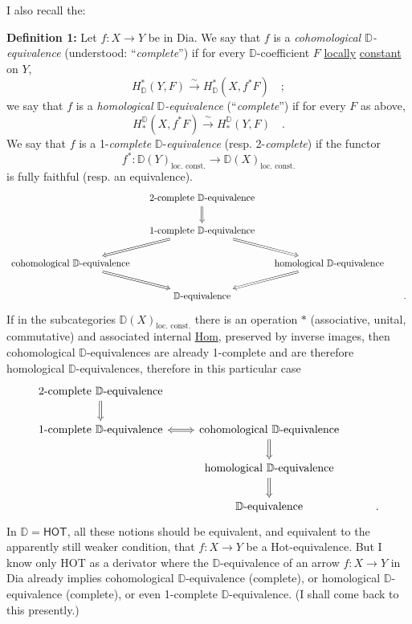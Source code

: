 \documentclass[11pt]{article}
\newcommand{\printedpage}[1]{\marginpar{\footnotesize p.~#1}}
\newcommand{\msp}[1]{\marginpar{\footnotesize [#1]}}
\newcommand{\HOT}{\textsf{HOT}}
\newcommand{\Hot}{\textsf{Hot}}
\newcommand{\Dia}{\textsf{Dia}}
\newcommand{\DD}{\mathbb{D}}
\begin{document}
I also recall the:

\textbf{Definition 1:} Let $f : X \to Y$ be in \Dia. We say that $f$ is a \textit{cohomological $\DD$-equivalence} (understood: ``\textit{complete}'') if for every $\DD$-coefficient $F$ \underline{locally} \underline{constant} on $Y$,
\[ H^{*}_{\DD}(Y,F) \xrightarrow{\ \sim\ } H^{*}_{\DD}(X,f^{*}F) \quad ; \]
we say that $f$ is a \textit{homological $\DD$-equivalence} (``\textit{complete}'') if for every $F$ as above,
\[ H_{*}^{\DD}(X,f^{*}F) \xrightarrow{\ \sim\ } H_{*}^{\DD}(Y,F) \quad . \]
We say that $f$ is a 1-\textit{complete} $\DD$-\textit{equivalence} (resp. 2-\textit{complete}) if the functor
\[ f^{*} : \DD(Y)_{\text{loc. const.}} \longrightarrow \DD(X)_{\text{loc. const.}} \]
is fully faithful (resp. an equivalence).
\[
\begin{tikzcd}[column sep=small]
 & \text{2-complete $\DD$-equivalence} \arrow[d, Rightarrow] & & \\
 & \text{1-complete $\DD$-equivalence} \arrow[dl, Rightarrow] \arrow[dr, Rightarrow] & & \\
\text{cohomological $\DD$-equivalence} \arrow[dr, Rightarrow] & & \text{homological $\DD$-equivalence} \arrow[dl, Rightarrow] & \\
 & \text{$\DD$-equivalence} & & .
\end{tikzcd}
\]
If in the subcategories $\DD(X)_{\text{loc. const.}}$ there is an operation $*$ (associative, unital, commutative) and associated internal \underline{\textsf{Hom}}, preserved by inverse images, then cohomological $\DD$-equivalences are already 1-complete and are therefore homological $\DD$-equivalences, therefore in this particular case
\printedpage{68}
\msp{page 114: blank}
\msp{page 115}
\[
\begin{tikzcd}
\text{2-complete $\DD$-equivalence} \arrow[d, Rightarrow] & & \\
\text{1-complete $\DD$-equivalence} \arrow[r, Leftrightarrow] & \text{cohomological $\DD$-equivalence} \arrow[d, Rightarrow] & \\
 & \text{homological $\DD$-equivalence} \arrow[d, Rightarrow] & \\
 & \text{$\DD$-equivalence} & .
\end{tikzcd}
\]
In $\DD = \mathsf{HOT}$, all these notions should be equivalent, and equivalent to the apparently still weaker condition, that $f : X \to Y$ be a \Hot-equivalence. But I know only \HOT{} as a derivator where the $\DD$-equivalence of an arrow $f : X \to Y$ in \Dia{} already implies cohomological $\DD$-equivalence (complete), or homological $\DD$-equivalence (complete), or even 1-complete $\DD$-equivalence. (I shall come back to this presently.)
\end{document}
